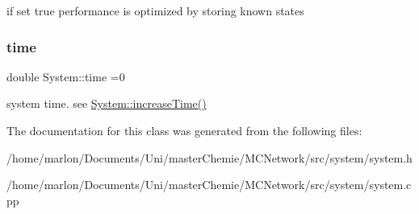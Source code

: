 if set true performance is optimized by storing known states \mbox{\label{classSystem_aa9e002a5f2f169e37c545b76ee67e724}} 
\subsubsection{\texorpdfstring{time}{time}}
{\footnotesize\ttfamily double System\+::time =0}

system time. see \hyperlink{classSystem_a6167b888fa30f9d8fa56a246c5f461b9}{System\+::increase\+Time()} 

The documentation for this class was generated from the following files\+:\begin{DoxyCompactItemize}
\item 
/home/marlon/\+Documents/\+Uni/master\+Chemie/\+M\+C\+Network/src/system/system.\+h\item 
/home/marlon/\+Documents/\+Uni/master\+Chemie/\+M\+C\+Network/src/system/system.\+cpp\end{DoxyCompactItemize}
